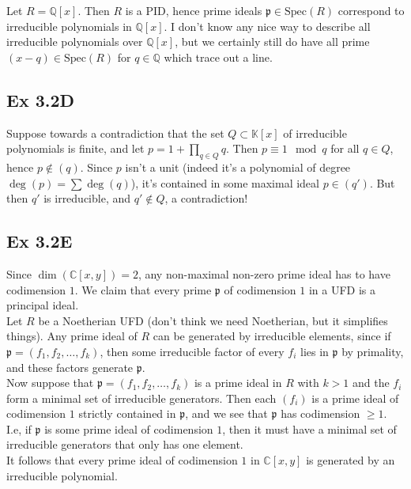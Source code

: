 \documentclass{article}
\theoremstyle{definition}
\newcommand{\Q}{\mathbb{Q}}
\newcommand{\C}{\mathbb{C}}
\newcommand{\K}{\mathbb{K}}
\newcommand{\Spec}{\text{Spec}}
\begin{document}
Let $R = \Q[x]$. Then $R$ is a PID, hence prime ideals $\mathfrak{p} \in
\Spec(R)$ correspond to irreducible polynomials in $\Q[x]$. I don't know any
nice way to describe all irreducible polynomials over $\Q[x]$, but we certainly
still do have all prime $(x - q) \in \Spec(R)$ for $q \in \Q$ which trace out a
line.

\subsection*{Ex 3.2D}

Suppose towards a contradiction that the set $Q \subset \K[x]$ of irreducible
polynomials is finite, and let $p = 1 + \prod_{q \in Q} q$. Then $p \equiv 1
\mod q$ for all $q \in Q$, hence $p \not \in (q)$. Since $p$ isn't a unit
(indeed it's a polynomial of degree $\deg(p) = \sum \deg(q)$), it's contained
in some maximal ideal $p \in (q')$. But then $q'$ is irreducible, and $q' \not
\in Q$, a contradiction!


\subsection*{Ex 3.2E}

Since $\dim(\C[x, y]) = 2$, any non-maximal non-zero prime ideal has to have
codimension $1$. We claim that every prime $\mathfrak{p}$ of codimension $1$
in a UFD is a principal ideal. \\ 

Let $R$ be a Noetherian UFD (don't think we need Noetherian, but it simplifies
things). Any prime ideal of $R$ can be generated by irreducible elements, since
if $\mathfrak{p} = (f_1, f_2, \ldots, f_k)$, then some irreducible factor of
every $f_i$ lies in $\mathfrak{p}$ by primality, and these factors generate
$\mathfrak{p}$. \\

Now suppose that $\mathfrak{p} = (f_1, f_2, \ldots, f_k)$ is a prime ideal in
$R$ with $k > 1$ and the $f_i$ form a minimal set of irreducible generators.
Then each $(f_i)$ is a prime ideal of codimension $1$ strictly contained in
$\mathfrak{p}$, and we see that $\mathfrak{p}$ has codimension $\geq 1$. \\

I.e, if $\mathfrak{p}$ is some prime ideal of codimension $1$, then it must
have a minimal set of irreducible generators that only has one element. \\

It follows that every prime ideal of codimension $1$ in $\C[x, y]$ is generated
by an irreducible polynomial.
\end{document}
